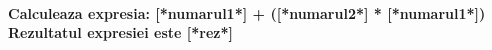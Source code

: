 \documentclass{exam}
\begin{document}
\paragraph{
Calculeaza expresia: [*numarul1*] + ([*numarul2*] * [*numarul1*]) \\
Rezultatul expresiei este [*rez*]
}
\end{document}
